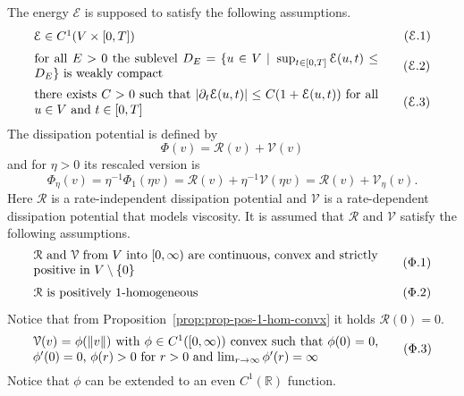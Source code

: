 \documentclass[letterpaper,oneside]{amsart}
\numberwithin{equation}{section}
\theoremstyle{definition}
\DeclarePairedDelimiter{\norm}{\lVert}{\rVert}
\begin{document}
The energy $\mathcal{E}$ is supposed to satisfy the following assumptions.
\begin{equation}
\label{eqn:energy-regularity}
\parbox[c]{0.8\textwidth}{$\mathcal{E}\in C^1(V\times[0,T])$}
\tag{$\mathcal{E}$.1}
\end{equation}
\begin{equation}
\label{eqn:energy-coercivity}
\parbox[c]{0.8\textwidth}{for all $E>0$ the sublevel $D_E=\{u\in V\;|\;\sup_{t\in[0,T]}\mathcal{E}(u,t)\le D_E\}$ is weakly compact}
\tag{$\mathcal{E}$.2}
\end{equation}
\begin{equation}
\label{eqn:power-control}
\parbox[c]{0.8\textwidth}{there exists $C>0$ such that $|\partial_t\mathcal{E}(u,t)|\le C(1+\mathcal{E}(u,t))$ for all $u\in V$ and $t\in[0,T]$}
\tag{$\mathcal{E}$.3}
\end{equation}
The dissipation potential is defined by
\begin{equation*}
\Phi(v)=\mathcal{R}(v)+\mathcal{V}(v)
\end{equation*}
and for $\eta>0$ its rescaled version is
\begin{equation*}
\Phi_\eta(v)=\eta^{-1}\Phi_1(\eta v)=\mathcal{R}(v)+\eta^{-1}\mathcal{V}(\eta v)=\mathcal{R}(v)+\mathcal{V}_\eta(v).
\end{equation*}
Here $\mathcal{R}$ is a rate-independent dissipation potential and $\mathcal{V}$ is a rate-dependent dissipation potential that models viscosity. It is assumed that $\mathcal{R}$ and $\mathcal{V}$ satisfy the following assumptions.
\begin{equation}
\label{eqn:bv-dissipation-1}
\parbox[c]{0.8\textwidth}{$\mathcal{R}$ and $\mathcal{V}$ from $V$ into $[0,\infty)$ are continuous, convex and strictly positive in $V\setminus\{0\}$}
\tag{$\Phi$.1}
\end{equation}
\begin{equation}
\label{eqn:bv-dissipation-2}
\parbox[c]{0.8\textwidth}{$\mathcal{R}$ is positively 1-homogeneous}
\tag{$\Phi$.2}
\end{equation}
Notice that from Proposition~\ref{prop:prop-pos-1-hom-convx} it holds $\mathcal{R}(0)=0$.
\begin{equation}
\label{eqn:bv-dissipation-3}
\parbox[c]{0.8\textwidth}{$\mathcal{V}(v)=\phi(\norm{v})$ with $\phi\in C^1([0,\infty))$ convex such that $\phi(0)=0$, $\phi'(0)=0$, $\phi(r)>0$ for $r>0$ and $\lim_{r\to\infty}\phi'(r)=\infty$}
\tag{$\Phi$.3}
\end{equation}
Notice that $\phi$ can be extended to an even $C^1(\mathbb{R})$ function.
\end{document}

